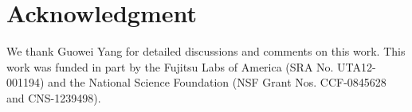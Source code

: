 \documentclass[conference, compsocconf]{IEEEtran}
\begin{document}
%



\section*{Acknowledgment}
We thank Guowei Yang for detailed discussions and comments on this work. This work was funded in part by the Fujitsu Labs of America (SRA No. UTA12-001194) and the National Science Foundation (NSF Grant Nos. CCF-0845628 and CNS-1239498).
\vspace*{-2ex}


\end{document}
